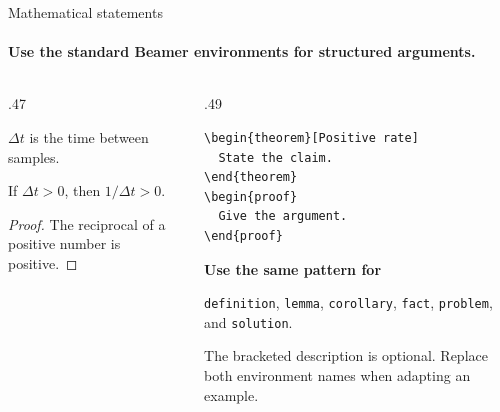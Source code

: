 \begin{frame}[fragile]{Mathematical statements}
  \framesubtitle{Use the standard Beamer environments for structured arguments.}
  \small
  \begin{columns}[T,onlytextwidth]
    \begin{column}{.47\textwidth}
      \begin{definition}
        \(\Delta t\) is the time between samples.
      \end{definition}
      \begin{theorem}
        If \(\Delta t>0\), then \(1/\Delta t>0\).
      \end{theorem}
      \begin{proof}
        The reciprocal of a positive number is positive.
      \end{proof}
    \end{column}
    \begin{column}{.49\textwidth}
      {\footnotesize
\begin{verbatim}
\begin{theorem}[Positive rate]
  State the claim.
\end{theorem}
\begin{proof}
  Give the argument.
\end{proof}
\end{verbatim}
      }
      \smallskip
      \textbf{Use the same pattern for}\par
      \texttt{definition}, \texttt{lemma}, \texttt{corollary},
      \texttt{fact}, \texttt{problem}, and \texttt{solution}.
      \medskip\par
      The bracketed description is optional. Replace both environment
      names when adapting an example.
    \end{column}
  \end{columns}
\end{frame}
